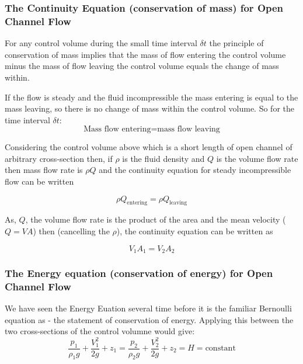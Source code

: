 \documentclass[a4paper, 12pt, british]{article} %
\numberwithin{equation}{section}
\numberwithin{figure}{section}
\numberwithin{table}{section}
\begin{document}
\subsubsection{The Continuity Equation (conservation of mass) for Open Channel Flow}
For any control volume during the small time interval $\delta t$ the principle of conservation of mass implies that the mass of flow entering the control volume minus the mass of flow leaving the control volume equals the change of mass within.

If the flow is steady and the fluid incompressible the mass entering is equal to the mass leaving, so there is no change of mass within the control volume.  So for the time interval $\delta t$:
\begin{equation*}
\text{Mass flow entering} = \text{mass flow leaving}
\end{equation*}

Considering the control volume above which is a short length of open channel of arbitrary cross-section then, if $\rho$ is the fluid density and $Q$ is the volume flow rate then
mass flow rate is $\rho Q$ and the continuity equation for steady incompressible flow can be written

 \begin{equation*}
\rho Q_\text{entering} = \rho Q_\text{leaving}
\end{equation*} 

As, $Q$, the volume flow rate is the product of the area and the mean velocity ($Q=VA$) then (cancelling the $\rho$), the continuity equation can be written as

\begin{equation}
V_1 A_1 = V_2 A_2
 \end{equation}


\subsubsection{The Energy equation (conservation of energy) for Open Channel Flow}

We have seen the Energy Euation several time before it is the familiar \textbf{}Bernoulli equation as - the statement of conservation of energy. Applying this between the two cross-sections of the control volumne
would give:
 \begin{equation}
\frac{p_1}{\rho_1 g}  + \frac{V_1^2}{2g} + z_1  = \frac{p_2}{\rho_2 g}  + \frac{V_2^2}{2g} + z_2 = H = \text{constant}
\label{eq:bernoulli}
 \end{equation}
\end{document}
